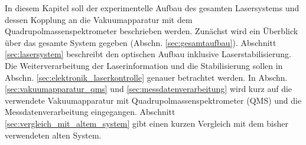 In diesem Kapitel soll der experimentelle Aufbau des gesamten Lasersystems und
dessen Kopplung an die Vakuumapparatur mit dem Quadrupolmassenspektrometer
beschrieben werden.
Zunächst wird ein Überblick über das gesamte System gegeben (Abschn.
\ref{sec:gesamtaufbau}). Abschnitt \ref{sec:lasersystem} beschreibt den
optischen Aufbau inklusive Laserstabilisierung. Die Weiterverarbeitung der
Laserinformation und die Stabilisierung sollen in Abschn.
\ref{sec:elektronik_laserkontrolle} genauer betrachtet werden. In Abschn.
\ref{sec:vakuumapparatur_qms} und \ref{sec:messdatenverarbeitung} wird kurz
auf die verwendete Vakuumapparatur mit Quadrupolmassenspektrometer (QMS) und die
Messdatenverarbeitung eingegangen.
Abschnitt \ref{sec:vergleich_mit_altem_system} gibt einen kurzen Vergleich mit dem
bisher verwendeten alten System.

